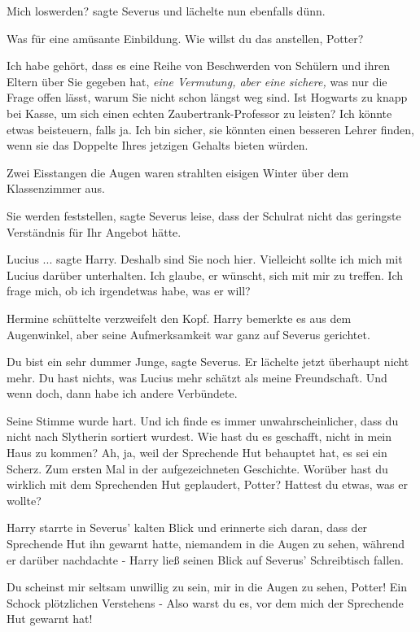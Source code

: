 \glqq Mich loswerden?\grqq{} sagte Severus und lächelte nun ebenfalls dünn.

\glqq Was für eine amüsante Einbildung. Wie willst du das anstellen,
Potter?\grqq{}

\glqq Ich habe gehört, dass es eine Reihe von Beschwerden von Schülern und ihren
Eltern über Sie gegeben hat\grqq{}, \emph{eine Vermutung, aber eine sichere,}
\glqq was nur die Frage offen lässt, warum Sie nicht schon längst weg sind. Ist
Hogwarts zu knapp bei Kasse, um sich einen echten Zaubertrank-Professor zu
leisten? Ich könnte etwas beisteuern, falls ja. Ich bin sicher, sie könnten
einen besseren Lehrer finden, wenn sie das Doppelte Ihres jetzigen Gehalts
bieten würden.\grqq{}

Zwei Eisstangen die Augen waren strahlten eisigen Winter über dem Klassenzimmer
aus.

\glqq Sie werden feststellen\grqq{}, sagte Severus leise, \glqq dass der
Schulrat nicht das geringste Verständnis für Ihr Angebot hätte.\grqq{}

\glqq Lucius ...\grqq{} sagte Harry. \glqq Deshalb sind Sie noch hier.
Vielleicht sollte ich mich mit Lucius darüber unterhalten. Ich glaube, er
wünscht, sich mit mir zu treffen. Ich frage mich, ob ich irgendetwas habe, was
er will?\grqq{}

Hermine schüttelte verzweifelt den Kopf. Harry bemerkte es aus dem Augenwinkel,
aber seine Aufmerksamkeit war ganz auf Severus gerichtet.

\glqq Du bist ein sehr dummer Junge\grqq{}, sagte Severus. Er lächelte jetzt
überhaupt nicht mehr. \glqq Du hast nichts, was Lucius mehr schätzt als meine
Freundschaft. Und wenn doch, dann habe ich andere Verbündete.\grqq{}

Seine Stimme wurde hart. \glqq Und ich finde es immer unwahrscheinlicher, dass
du nicht nach Slytherin sortiert wurdest. Wie hast du es geschafft, nicht in
mein Haus zu kommen? Ah, ja, weil der Sprechende Hut behauptet hat, es sei ein
Scherz. Zum ersten Mal in der aufgezeichneten Geschichte. Worüber hast du
wirklich mit dem Sprechenden Hut geplaudert, Potter? Hattest du etwas, was er
wollte?\grqq{}

Harry starrte in Severus' kalten Blick und erinnerte sich daran, dass der
Sprechende Hut ihn gewarnt hatte, niemandem in die Augen zu sehen, während er
darüber nachdachte - Harry ließ seinen Blick auf Severus' Schreibtisch fallen.

\glqq Du scheinst mir seltsam unwillig zu sein, mir in die Augen zu sehen,
Potter!\grqq{} Ein Schock plötzlichen Verstehens - \glqq Also warst du es, vor
dem mich der Sprechende Hut gewarnt hat!\grqq{}

